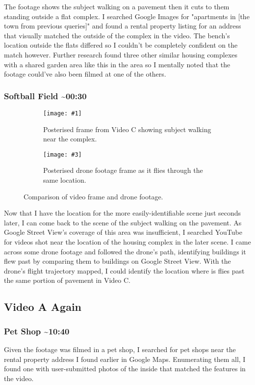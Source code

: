 \documentclass[a4paper,11pt]{report}
\newcommand{\comparison}[5] {
    \begin{figure}[htbp]
        \centering
        
        \begin{subfigure}[t]{0.45\textwidth}
            \centering
            \texttt{[image: \#1]}
            \caption{#2}
        \end{subfigure}
        \hfill
        \begin{subfigure}[t]{0.45\textwidth}
            \centering
            \texttt{[image: \#3]}
            \caption{#4}
        \end{subfigure}
    
        \caption{#5}
    \end{figure}
}
\begin{document}
The footage shows the subject walking on a pavement then it cuts to them standing outside a flat complex. I searched Google Images for "apartments in [the town from previous queries]" and found a rental property listing for an address that visually matched the outside of the complex in the video. The bench's location outside the flats differed so I couldn’t be completely confident on the match however. Further research found three other similar housing complexes with a shared garden area like this in the area so I mentally noted that the footage could've also been filmed at one of the others.

\subsubsection{Softball Field \~{}00:30}

\comparison
    {images/pavement-video.png}
    {Posterised frame from Video C showing subject walking near the complex.}
    {images/pavement-drone.png}
    {Posterised drone footage frame as it flies through the same location.}
    {Comparison of video frame and drone footage.}

Now that I have the location for the more easily-identifiable scene just seconds later, I can come back to the scene of the subject walking on the pavement. As Google Street View's coverage of this area was insufficient, I searched YouTube for videos shot near the location of the housing complex in the later scene. I came across some drone footage and followed the drone's path, identifying buildings it flew past by comparing them to buildings on Google Street View. With the drone's flight trajectory mapped, I could identify the location where is flies past the same portion of pavement in Video C.

\subsection{Video A Again}

\subsubsection{Pet Shop \~{}10:40}

Given the footage was filmed in a pet shop, I searched for pet shops near the rental property address I found earlier in Google Maps. Enumerating them all, I found one with user-submitted photos of the inside that matched the features in the video.
\end{document}
